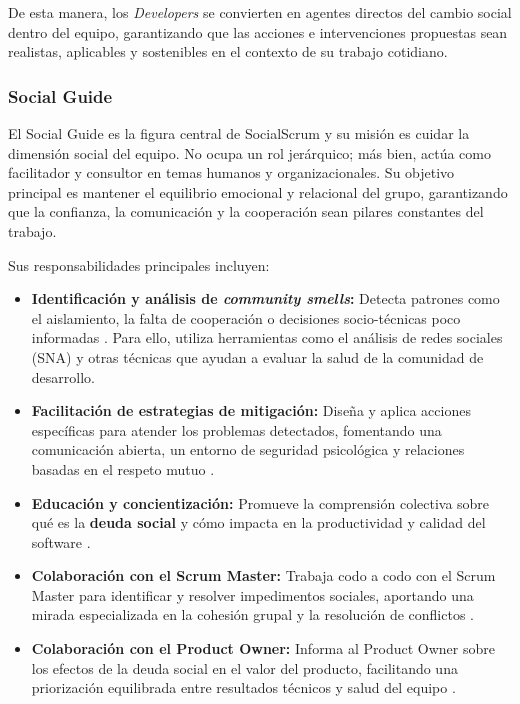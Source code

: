De esta manera, los \textit{Developers} se convierten en agentes directos del cambio social dentro del equipo, garantizando que las acciones e intervenciones propuestas sean realistas, aplicables y sostenibles en el contexto de su trabajo cotidiano.

\subsubsection{Social Guide}

El Social Guide es la figura central de SocialScrum y su misión es cuidar la dimensión social del equipo. No ocupa un rol jerárquico; más bien, actúa como facilitador y consultor en temas humanos y organizacionales. Su objetivo principal es mantener el equilibrio emocional y relacional del grupo, garantizando que la confianza, la comunicación y la cooperación sean pilares constantes del trabajo.

Sus responsabilidades principales incluyen:

\begin{itemize}
    \item \textbf{Identificación y análisis de \textit{community smells}:} Detecta patrones como el aislamiento, la falta de cooperación o decisiones socio-técnicas poco informadas \cite{saeeda2024nontechnicaldebt}. Para ello, utiliza herramientas como el análisis de redes sociales (SNA) y otras técnicas que ayudan a evaluar la salud de la comunidad de desarrollo.

    \item \textbf{Facilitación de estrategias de mitigación:} Diseña y aplica acciones específicas para atender los problemas detectados, fomentando una comunicación abierta, un entorno de seguridad psicológica y relaciones basadas en el respeto mutuo \cite{saeeda2024nontechnicaldebt, martini2019agiledebt}.

    \item \textbf{Educación y concientización:} Promueve la comprensión colectiva sobre qué es la \textbf{deuda social} y cómo impacta en la productividad y calidad del software \cite{tamburri2015insights}.

    \item \textbf{Colaboración con el Scrum Master:} Trabaja codo a codo con el Scrum Master para identificar y resolver impedimentos sociales, aportando una mirada especializada en la cohesión grupal y la resolución de conflictos \cite{schwaber2020scrum}.

    \item \textbf{Colaboración con el Product Owner:} Informa al Product Owner sobre los efectos de la deuda social en el valor del producto, facilitando una priorización equilibrada entre resultados técnicos y salud del equipo \cite{saeeda2024nontechnicaldebt, tulili2022burnout}.
\end{itemize}

